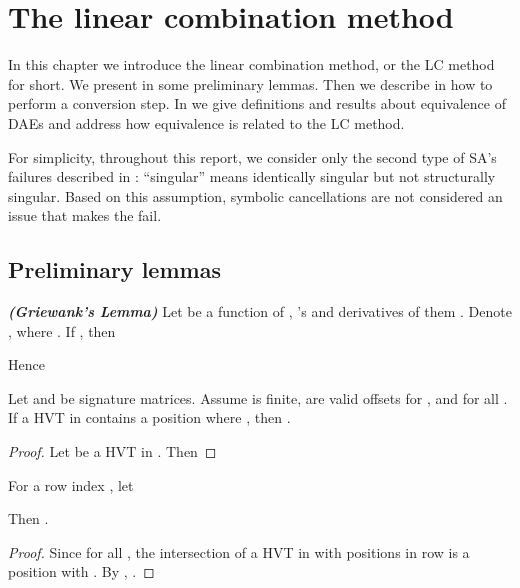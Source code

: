 \chapter{The linear combination method}\label{ch:LCmethod}
In this chapter we introduce the linear combination method, or the LC method for short. We present in  some preliminary lemmas. Then we describe in  how to perform a conversion step. In  we give definitions and results about equivalence of DAEs and address how equivalence is related to the LC method.

For simplicity, throughout this report, we consider only the second type of SA's failures described in : ``singular'' means identically singular but not structurally singular.
Based on this assumption, symbolic cancellations are not considered an issue that makes the \Sigmeth fail. 


\section{Preliminary lemmas}\label{sc:LCprelim}


\begin{lemma}\label{le:griewank}
{\bf\em (Griewank's Lemma)}\cite[Lemma 5.1]{nedialkov2007solving}
Let  be a function of , 's and derivatives of them . Denote , where . If ,
then

Hence

\end{lemma}



\begin{lemma}\label{le:sigred0}
Let  and  be  signature matrices. 
Assume  is finite,   are valid offsets for , 
and  for all . 
If a HVT in  contains a position  where , then .
\end{lemma}
\begin{proof}
Let  be a HVT in . Then

\renewcommand{\qed}{}
\end{proof}

\begin{corollary}\label{co:sigred}
For a row index , let

Then .
\end{corollary}

\begin{proof}
Since  for all , the intersection of a HVT in  with positions in row  is a position  with . By ,  
.
\end{proof}

